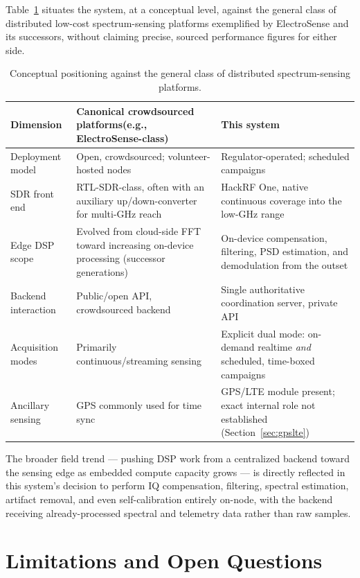 \documentclass[11pt,a4paper]{article}
\begin{document}
Table~\ref{tab:sota} situates the system, at a conceptual level, against the general class of
distributed low-cost spectrum-sensing platforms exemplified by ElectroSense and its
successors, without claiming precise, sourced performance figures for either side.

\begin{table}[H]
\centering
\small
\begin{tabular}{@{}p{3.6cm}p{5.4cm}p{5.4cm}@{}}
\toprule
\textbf{Dimension} & \textbf{Canonical crowdsourced platforms\newline(e.g., ElectroSense-class)} & \textbf{This system} \\
\midrule
Deployment model & Open, crowdsourced; volunteer-hosted nodes & Regulator-operated; scheduled campaigns \\
SDR front end & RTL-SDR-class, often with an auxiliary up/down-converter for multi-GHz reach & HackRF One, native continuous coverage into the low-GHz range \\
Edge DSP scope & Evolved from cloud-side FFT toward increasing on-device processing (successor generations) & On-device compensation, filtering, PSD estimation, and demodulation from the outset \\
Backend interaction & Public/open API, crowdsourced backend & Single authoritative coordination server, private API \\
Acquisition modes & Primarily continuous/streaming sensing & Explicit dual mode: on-demand realtime \emph{and} scheduled, time-boxed campaigns \\
Ancillary sensing & GPS commonly used for time sync & GPS/LTE module present; exact internal role not established (Section~\ref{sec:gpslte}) \\
\bottomrule
\end{tabular}
\caption{Conceptual positioning against the general class of distributed spectrum-sensing platforms.}
\label{tab:sota}
\end{table}

The broader field trend --- pushing DSP work from a centralized backend toward the sensing
edge as embedded compute capacity grows --- is directly reflected in this system's decision
to perform IQ compensation, filtering, spectral estimation, artifact removal, and even
self-calibration entirely on-node, with the backend receiving already-processed spectral and
telemetry data rather than raw samples.

\section{Limitations and Open Questions}
\end{document}
